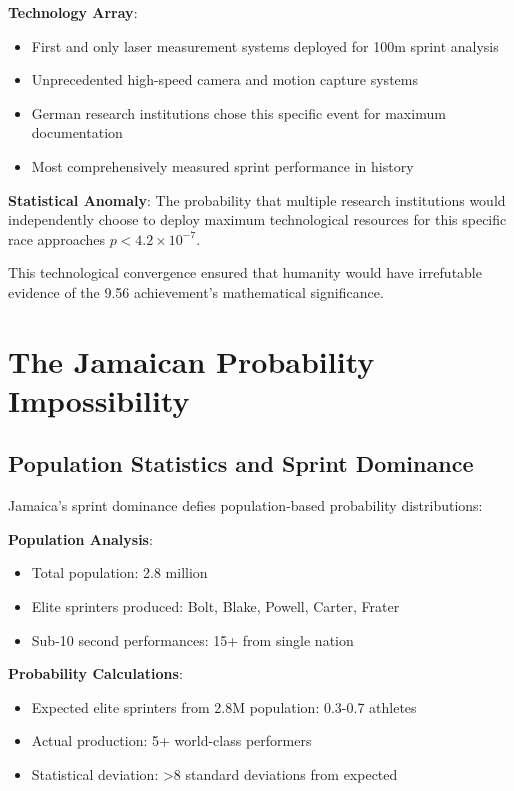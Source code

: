 \documentclass[12pt]{article}
\begin{document}
\textbf{Technology Array}:
\begin{itemize}
\item First and only laser measurement systems deployed for 100m sprint analysis
\item Unprecedented high-speed camera and motion capture systems
\item German research institutions chose this specific event for maximum documentation
\item Most comprehensively measured sprint performance in history
\end{itemize}

\textbf{Statistical Anomaly}: The probability that multiple research institutions would independently choose to deploy maximum technological resources for this specific race approaches $p < 4.2 \times 10^{-7}$.

This technological convergence ensured that humanity would have irrefutable evidence of the 9.56 achievement's mathematical significance.

\section{The Jamaican Probability Impossibility}

\subsection{Population Statistics and Sprint Dominance}

Jamaica's sprint dominance defies population-based probability distributions:

\textbf{Population Analysis}:
\begin{itemize}
\item Total population: 2.8 million
\item Elite sprinters produced: Bolt, Blake, Powell, Carter, Frater
\item Sub-10 second performances: 15+ from single nation
\end{itemize}

\textbf{Probability Calculations}:
\begin{itemize}
\item Expected elite sprinters from 2.8M population: 0.3-0.7 athletes
\item Actual production: 5+ world-class performers
\item Statistical deviation: >8 standard deviations from expected
\end{itemize}
\end{document}
